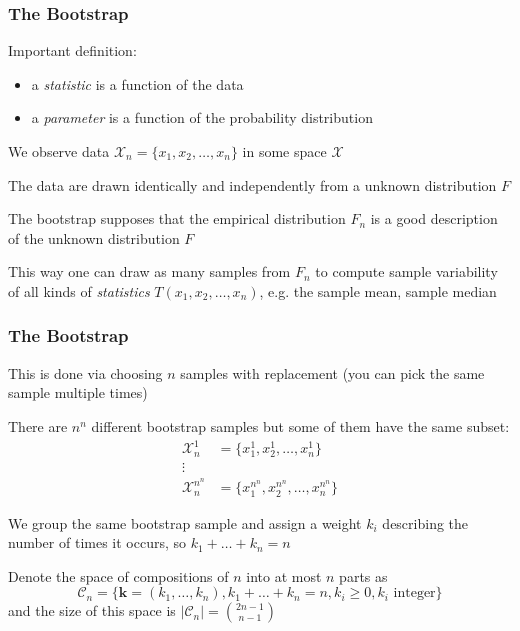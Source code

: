 \documentclass[10pt]{beamer}
\begin{document}
\begin{frame}
\frametitle{The Bootstrap}

Important definition: 
\begin{itemize}
\item a \textit{statistic} is a function of the data
\item a \textit{parameter} is a function of the probability distribution 
\end{itemize}

\vspace{0.3cm}
We observe data $\mathcal{X}_n = \{ x_1, x_2, \dots, x_n \}$ in some space $\mathcal{X}$ \newline

The data are drawn identically and independently from a unknown distribution $F$ \newline

The bootstrap supposes that the empirical distribution $F_n$ is a good description of the unknown distribution $F$ \newline

This way one can draw as many samples from $F_n$ to compute sample variability of all kinds of \textit{statistics} $T(x_1, x_2, \dots, x_n)$, e.g. the sample mean, sample median

\end{frame}

\begin{frame}
\frametitle{The Bootstrap}

This is done via choosing $n$ samples with replacement (you can pick the same sample multiple times) \newline

There are $n^n$ different bootstrap samples but some of them have the same subset: 
\begin{align}
\mathcal{X}_n^1 & = \{ x_1^1, x_2^1, \dots, x_n^1 \} \\
\vdots \\
\mathcal{X}_n^{n^n} & = \{ x_1^{n^n}, x_2^{n^n}, \dots, x_n^{n^n} \}
\end{align}

We group the same bootstrap sample and assign a weight $k_i$ describing the number of times it occurs, so $k_1 + \dots + k_n = n$ \newline

Denote the space of compositions of $n$ into at most $n$ parts as
\[ 
\mathcal{C}_n = \{ \boldsymbol{k} = (k_1,\dots,k_n), k_1+\dots+k_n=n, k_i \ge 0, k_i \text{ integer} \}
\]
and the size of this space is $|\mathcal{C}_n| = \binom{2n-1 }{n-1}$ 
 
\end{frame}
\end{document}
